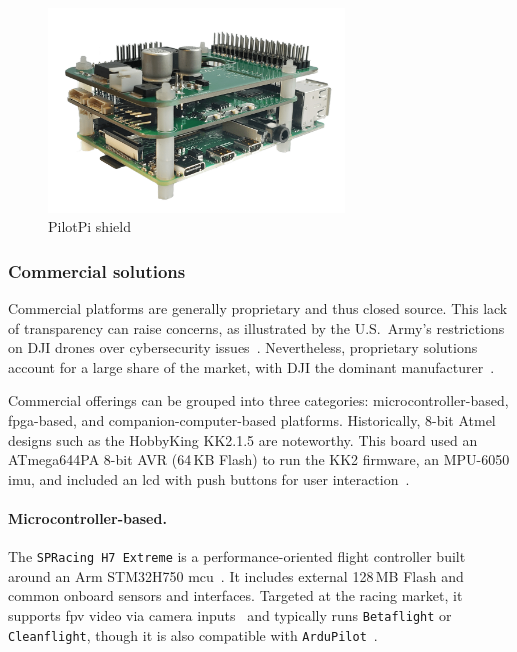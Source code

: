 \begin{figure}[!hbt]
  \centering
  \includegraphics[width=0.7\textwidth]{./img/png/rpi-pilotpi}
  \caption[PilotPi shield]{PilotPi shield~\cite{px4-pilotpi}\footnotemark}
  \label{fig:pilotpi}
\end{figure}

\subsubsection{Commercial solutions}%
\label{sec:commercial-solutions-hw}
Commercial platforms are generally proprietary and thus closed source. 
This lack of transparency can raise concerns, as illustrated by the U.S.\ Army’s restrictions on DJI drones over cybersecurity issues~\cite{suasNewsDjiDronesBanned2017,djiBan2022}. 
Nevertheless, proprietary solutions account for a large share of the market, with DJI the dominant manufacturer~\cite{droneAnalyst2021}.

Commercial offerings can be grouped into three categories: microcontroller-based, \gls{fpga}-based, and companion-computer-based platforms. 
Historically, 8-bit Atmel designs such as the HobbyKing KK2.1.5 are noteworthy. 
This board used an ATmega644PA 8-bit AVR (64\,KB Flash) to run the KK2 firmware, an MPU-6050 \gls{imu}, and included an \gls{lcd} with push buttons for user interaction~\cite{hobbykingKK2}. 

\paragraph{Microcontroller-based.}
The \lstinline|SPRacing H7 Extreme| is a performance-oriented flight controller built around an Arm STM32H750 \gls{mcu}~\cite{spRacing}. 
It includes external 128\,MB Flash and common onboard sensors and interfaces. 
Targeted at the racing market, it supports \gls{fpv} video via camera inputs~\cite{spRacing} and typically runs \lstinline|Betaflight| or \lstinline|Cleanflight|, though it is also compatible with \lstinline|ArduPilot|~\cite{arduPilot-SPRacing}.

